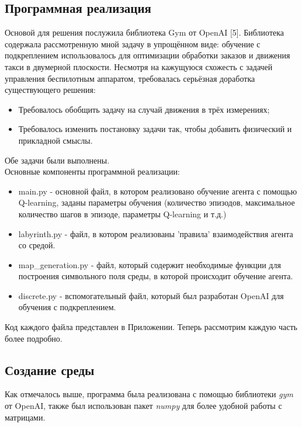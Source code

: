 \documentclass[a4paper]{report}
\theoremstyle{definition}
\theoremstyle{plain}
\theoremstyle{remark}
\theoremstyle{remark}
\theoremstyle{definition}
\begin{document}
\newpage
\begin{center}
\section{Программная реализация}
\end{center}

Основой для решения послужила библиотека Gym от OpenAI [5]. Библиотека содержала рассмотренную мной задачу в упрощённом виде: обучение с подкреплением использовалось для оптимизации обработки заказов и движения такси в двумерной плоскости.
Несмотря на кажущуюся схожесть с задачей управления беспилотным аппаратом, требовалась серьёзная доработка существующего решения:
\begin{itemize}
\item Требовалось обобщить задачу на случай движения в трёх измерениях;
\item Требовалось изменить постановку задачи так, чтобы добавить физический и прикладной смыслы.
 \end{itemize}

Обе задачи были выполнены.\\ 

Основные компоненты программной реализации:
\begin{itemize}
\item main.py - основной файл, в котором реализовано обучение агента с помощью Q-learning, заданы параметры обучения (количество эпизодов, максимальное количество шагов в эпизоде, параметры Q-learning и т.д.)
\item labyrinth.py - файл, в котором реализованы 'правила' взаимодействия агента со средой.
\item map\_generation.py - файл, который содержит необходимые функции для построения символьного поля среды, в которой происходит обучение агента.
\item discrete.py - вспомогательный файл, который был разработан OpenAI для обучения с подкреплением.
 \end{itemize}

Код каждого файла представлен в Приложении.
Теперь рассмотрим каждую часть более подробно.
\begin{center}
    \subsection{Создание среды}
\end{center}

Как отмечалось выше, программа была реализована с помощью библиотеки \textit{gym} от OpenAI, также был использован пакет \textit{numpy} для более удобной работы с матрицами.
\end{document}
